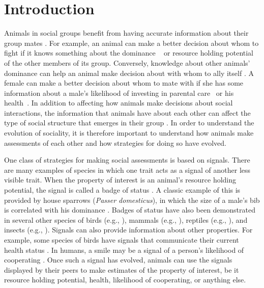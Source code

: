 \section*{Introduction} 
Animals in social groups benefit from having accurate information about their group mates \citep{Seyfarth:2010bh}. For example, an animal can make a better decision about whom to fight if it knows something about the dominance ~\citep{Waal:1986ys,Cowlishaw:1990vn,Bergman:2003qf,Seyfarth:2005ve,Flack:2006uq,Hobson:2015uq} or resource holding potential~\citep{Rhijn:1980uq,Freeman:1985kl,Dick:1990cr,Lemel:1993ve,Part:1997ys} of the other members of its group. Conversely, knowledge about other animals' dominance can help an animal make decision about with whom to ally itself \citep{Engh:2005qp}. A female can  make a better decision about whom to mate with if she has some information about a male's likelihood of investing in parental care~\citep{Qvarnstrom:1997fk,McGlothlin:2007au,Olsen:2010uq} or his health~\citep{Folstad:1992kx,Loyau:2005nx}. In addition to affecting how animals make decisions about social interactions, the information that animals have about each other can affect the type of social structure that emerges in their group \citep{Dugatkin:2004hz,Hobson:2015uq,Brush:2018ss}. In order to understand the evolution of sociality, it is therefore important to understand how animals make assessments of each other and how strategies for doing so have evolved.  

One class of strategies for making social assessments is based on signals. There are many examples of species in which one trait acts as a signal of another less visible trait. When the property of interest is an animal's resource holding potential, the signal is called a badge of status \citep{dawkins1978signals,Rohwer:1981vn,Rohwer:1982fk,Ripoll:2004vn,sheehan2016evotradeoff}. A classic example of this is provided by house sparrows (\emph{Passer domesticus}), in which the size of a male's bib is correlated with his dominance \citep{Veiga:1993fk,Veiga:1995ys}. Badges of status have also been demonstrated in several other species of birds (e.g., \citep{Remy:2010fk,Olsen:2010uq,Lemel:1993ve,Tibbetts:2009kx}), mammals (e.g., \citep{Gerald:2001zm}), reptiles (e.g., \citep{Fox:1990hd}), and insects (e.g., \citep{Tibbetts:2004kx}). Signals can also provide information about other properties. For example, some species of birds have signals that communicate their current health status \citep{Folstad:1992kx,Loyau:2005nx}. In humans, a smile may be a signal of a person's likelihood of cooperating \citep{Schug:2010be}. Once such a signal has evolved, animals can use the signals displayed by their peers to make estimates of the property of interest, be it resource holding potential, health, likelihood of cooperating, or anything else.

